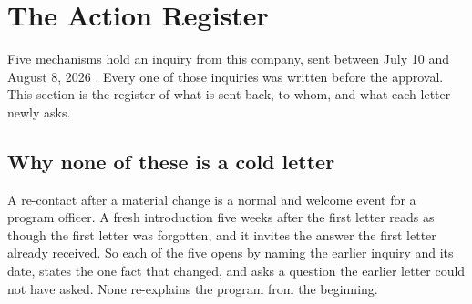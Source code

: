 \section{The Action Register}

Five mechanisms hold an inquiry from this company, sent between July 10 and
August 8, 2026 \cite{tenapps2026}. Every one of those inquiries was written
before the approval. This section is the register of what is sent back, to whom,
and what each letter newly asks.

\subsection{Why none of these is a cold letter}

A re-contact after a material change is a normal and welcome event for a program
officer. A fresh introduction five weeks after the first letter reads as though
the first letter was forgotten, and it invites the answer the first letter
already received. So each of the five opens by naming the earlier inquiry and its
date, states the one fact that changed, and asks a question the earlier letter
could not have asked. None re-explains the program from the beginning.

